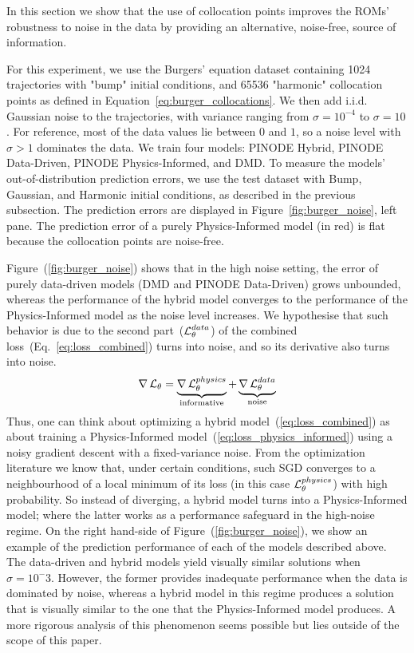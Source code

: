 In this section we show that the use of collocation points improves the ROMs' robustness to noise in the data by providing an alternative, noise-free, source of information.

For this experiment, we use the Burgers' equation dataset containing 1024 trajectories with "bump" initial conditions, and 65536 "harmonic" collocation points as defined in Equation~\ref{eq:burger_collocations}. We then add i.i.d. Gaussian noise to the trajectories, with variance ranging from $\sigma = 10^{-4}$ to $\sigma = 10$. For reference, most of the data values lie between $0$ and $1$, so a noise level with $\sigma > 1$ dominates the data. We train four models: PINODE Hybrid, PINODE Data-Driven, PINODE Physics-Informed, and DMD. To measure the models' out-of-distribution prediction errors, we use the test dataset with Bump, Gaussian, and Harmonic initial conditions, as described in the previous subsection. The prediction errors are displayed in Figure~\ref{fig:burger_noise}, left pane. The prediction error of a purely Physics-Informed model (in red) is flat because the collocation points are noise-free. 

Figure~(\ref{fig:burger_noise}) shows that in the high noise setting, the error of purely data-driven models (DMD and PINODE Data-Driven) grows unbounded, whereas the performance of the hybrid model converges to the performance of the Physics-Informed model as the noise level increases. We hypothesise that such behavior is due to the second part~($\operatorname{\mathcal{L}}_{\theta}^{data}$) of the combined loss~(Eq.~\ref{eq:loss_combined}) turns into noise, and so its derivative also turns into noise.
\begin{equation}
    \nabla \operatorname{\mathcal{L}}_{\theta} = \underbrace{\nabla\operatorname{\mathcal{L}}_{\theta}^{physics}}_{\text{informative}} + \underbrace{\nabla\operatorname{\mathcal{L}}_{\theta}^{data}}_{\text{noise}}
\end{equation}
Thus, one can think about optimizing a hybrid model~(\ref{eq:loss_combined}) as about training a Physics-Informed model~(\ref{eq:loss_physics_informed}) using a noisy gradient descent with a fixed-variance noise. From the optimization literature \cite{friedlander2012hybrid,patel2021global,shapiro2021lectures} we know that, under certain conditions, such SGD converges to a neighbourhood of a local minimum of its loss (in this case $\operatorname{\mathcal{L}}_{\theta}^{physics}$) with high probability. So instead of diverging, a hybrid model turns into a Physics-Informed model; where the latter works as a performance safeguard in the high-noise regime.  On the right hand-side of Figure~(\ref{fig:burger_noise}), we show an example of the prediction performance of each of the models described above. The data-driven and hybrid models yield visually similar solutions when $\sigma = 10^-3$. However, the former provides inadequate performance when the data is dominated by noise, whereas a hybrid model in this regime produces a solution that is visually similar to the one that the Physics-Informed model produces. A more rigorous analysis of this phenomenon seems possible but lies outside of the scope of this paper.


